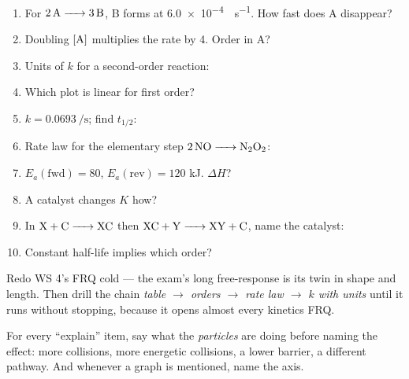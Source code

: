 \documentclass{apchem-worksheet}
\begin{document}
\begin{enumerate}[leftmargin=*,itemsep=0.4em]
  \item For $\ce{2A -> 3B}$, B forms at \SI{6.0e-4}{\Molar\per\second}. How
        fast does A disappear?
  \item Doubling $[\ce{A}]$ multiplies the rate by 4. Order in A?
  \item Units of $k$ for a second-order reaction:
        \answerblank[3.2cm]{\si{\per\Molar\per\second}}
  \item Which plot is linear for first order?
  \item $k = \SI{0.0693}{\per\second}$; find $t_{1/2}$:
  \item Rate law for the elementary step $\ce{2NO -> N2O2}$:
  \item $E_a(\text{fwd}) = 80$, $E_a(\text{rev}) = 120$ kJ. $\Delta H$?
  \item A catalyst changes $K$ how? 
  \item In $\ce{X + C -> XC}$ then $\ce{XC + Y -> XY + C}$, name the
        catalyst: 
  \item Constant half-life implies which order?
\end{enumerate}

\begin{apcnote}
Redo WS 4's FRQ cold --- the exam's long free-response is its twin in shape
and length. Then drill the chain \emph{table $\to$ orders $\to$ rate law
$\to$ $k$ with units} until it runs without stopping, because it opens
almost every kinetics FRQ.

For every ``explain'' item, say what the \emph{particles} are doing before
naming the effect: more collisions, more energetic collisions, a lower
barrier, a different pathway. And whenever a graph is mentioned, name the
axis.
\end{apcnote}
\end{document}
